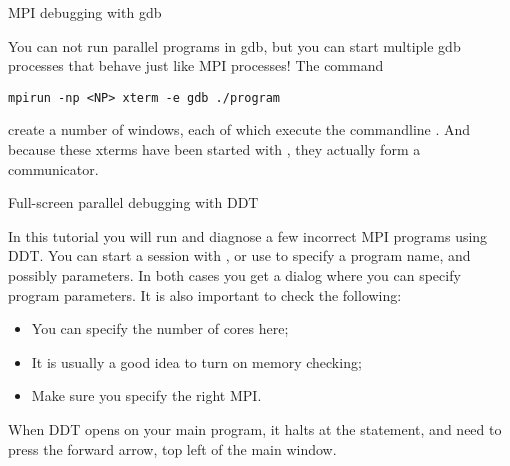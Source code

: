  {MPI debugging with gdb}

You can not run parallel programs in gdb, but you can start multiple
gdb processes that behave just like MPI processes! The command
\begin{verbatim}
mpirun -np <NP> xterm -e gdb ./program 
\end{verbatim}
create a number of  windows, each of which execute
the commandline . And because these xterms have
been started with , they actually form a communicator.

\begin{pcse}
 {Full-screen parallel debugging with DDT}

In this tutorial you will run and diagnose a few incorrect MPI
programs using DDT.  You can start a session with , or use  to specify a program name,
and possibly parameters.  In both cases you get a dialog where you
can specify program parameters. It is also important to check the following:
\begin{itemize}
\item You can specify the number of cores here;
\item It is usually a good idea to turn on memory checking;
\item Make sure you specify the right MPI.
\end{itemize}

When DDT opens on your main program, it halts at the 
statement, and need to press the forward arrow, top left of the main
window.


\end{pcse}
